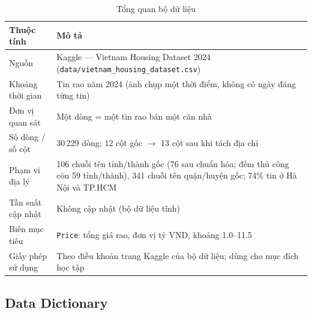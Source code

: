 \documentclass[11pt]{article}
\newcommand{\ty}{tỷ VND}
\begin{document}
\begin{table}[H]
\centering
\small
\caption{Tổng quan bộ dữ liệu}
\begin{tabular}{@{}L{0.30\textwidth}L{0.62\textwidth}@{}}
\toprule
\textbf{Thuộc tính} & \textbf{Mô tả} \\
\midrule
Nguồn & Kaggle --- Vietnam Housing Dataset 2024 (\texttt{data/vietnam\_housing\_dataset.csv}) \\
Khoảng thời gian & Tin rao năm 2024 (ảnh chụp một thời điểm, không có ngày đăng từng tin) \\
Đơn vị quan sát & Một dòng = một tin rao bán một căn nhà \\
Số dòng / số cột & 30\,229 dòng; 12 cột gốc $\rightarrow$ 13 cột sau khi tách địa chỉ \\
Phạm vi địa lý & 106 chuỗi tên tỉnh/thành gốc (76 sau chuẩn hóa; đếm thủ công còn 59 tỉnh/thành), 341 chuỗi tên quận/huyện gốc; 74\% tin ở Hà Nội và TP.HCM \\
Tần suất cập nhật & Không cập nhật (bộ dữ liệu tĩnh) \\
Biến mục tiêu & \texttt{Price}: tổng giá rao, đơn vị \ty, khoảng 1.0--11.5 \\
Giấy phép sử dụng & Theo điều khoản trang Kaggle của bộ dữ liệu; dùng cho mục đích học tập \\
\bottomrule
\end{tabular}
\end{table}

\subsection{Data Dictionary}
\end{document}
